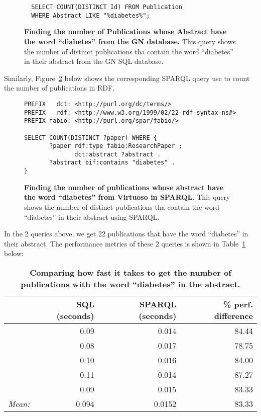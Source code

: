 \begin{figure}[H]
\centering
\begin{verbatim}
  SELECT COUNT(DISTINCT Id) FROM Publication
  WHERE Abstract LIKE "%diabetes%";
\end{verbatim}
\caption[SQL Query to count publications with the word ``diabetes'']{\textbf{Finding the number of Publications whose Abstract have the word ``diabetes'' from the GN database.}  This query shows the number of distinct publications tha contain the word ``diabetes'' in their abstract from the GN SQL database.}\label{sql:counting-pubs-with-diabetes}
\end{figure}

Similarly, Figure~\ref{sparql:counting-pubs-with-diabetes} below shows the corresponding SPARQL query use to count the number of publications in RDF\@.

\begin{figure}[H]
\centering
\begin{verbatim}
PREFIX   dct: <http://purl.org/dc/terms/>
PREFIX   rdf: <http://www.w3.org/1999/02/22-rdf-syntax-ns#>
PREFIX fabio: <http://purl.org/spar/fabio/>

SELECT COUNT(DISTINCT ?paper) WHERE {
       ?paper rdf:type fabio:ResearchPaper ;
              dct:abstract ?abstract .
       ?abstract bif:contains "diabetes" .
}
\end{verbatim}
\caption[SPARQL Query to count publications with the word ``diabetes'']{\textbf{Finding the number of publications whose abstract have the word ``diabetes'' from Virtuoso in SPARQL.}  This query shows the number of distinct publications tha contain the word ``diabetes'' in their abstract using SPARQL.}\label{sparql:counting-pubs-with-diabetes}
\end{figure}

In the 2 queries above, we get 22 publications that have the word ``diabetes'' in their abstract.  The performance metrics of these 2 queries is shown in Table~\ref{table:perf-1} below:

\begin{table}[H]
\begin{tabular}{r|rr|r}
& SQL (seconds) & SPARQL (seconds) & \% perf. difference\\[0pt]
\toprule
& 0.09 & 0.014 & 84.44\\[0pt]
& 0.08 & 0.017 & 78.75\\[0pt]
& 0.10 & 0.016 & 84.00\\[0pt]
& 0.11 & 0.014 & 87.27\\[0pt]
& 0.09 & 0.015 & 83.33\\[0pt]
\toprule
\textit{Mean:} & 0.094 & 0.0152 & 83.33\\[0pt]
\end{tabular}
\caption[Performance comparison in seconds: publication count with "diabetes" (SQL vs SPARQL)]{\textbf{Comparing how fast it takes to get the number of publications with the word ``diabetes'' in the abstract.}}\label{table:perf-1}
\end{table}


